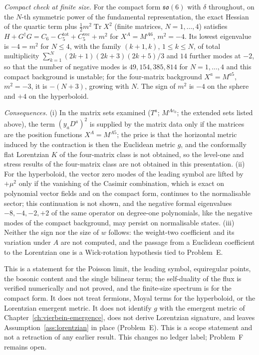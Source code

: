 \emph{Compact check at finite size.} For the compact form \(\mathfrak{so}(6)\) with \(\delta\) throughout, on the \(N\)-th symmetric power of the fundamental representation, the exact Hessian of the quartic term plus \(\tfrac12m^2\operatorname{Tr}X^2\) (finite matrices, \(N=1,\dots,4\)) satisfies \(H+G^\dagger G=C_6-C_5^{\mathrm{tot}}+C_5^{\mathrm{vec}}+m^2\) for \(X^A=M^{A6}\), \(m^2=-4\). Its lowest eigenvalue is \(-4=m^2\) for \(N\le4\), with the family \((k+1,k)\), \(1\le k\le N\), of total multiplicity \(\sum_{k=1}^{N}(2k+1)(2k+3)(2k+5)/3\) and \(14\) further modes at \(-2\), so that the number of negative modes is \(49,154,385,814\) for \(N=1,\dots,4\) and this compact background is unstable; for the four-matrix background \(X^a=M^{a5}\), \(m^2=-3\), it is \(-(N+3)\), growing with \(N\). The sign of \(m^2\) is \(-4\) on the sphere and \(+4\) on the hyperboloid.

\emph{Consequences.} (i) In the matrix sets examined (\(T^a\); \(M^{Ac_0}\); the extended sets listed above), the term \((y_aD^a)^2\) is supplied by the matrix data only if the matrices are the position functions \(X^A=M^{A5}\); the price is that the horizontal metric induced by the contraction is then the Euclidean metric \(g\), and the conformally flat Lorentzian \(K\) of the four-matrix class is not obtained, so the level-one and stress results of the four-matrix class are not obtained in this presentation. (ii) For the hyperboloid, the vector zero modes of the leading symbol are lifted by \(+\mu^2\) only if the vanishing of the Casimir combination, which is exact on polynomial vector fields and on the compact form, continues to the normalisable sector; this continuation is not shown, and the negative formal eigenvalues \(-8,-4,-2,+2\) of the same operator on degree-one polynomials, like the negative modes of the compact background, may persist on normalisable states. (iii) Neither the sign nor the size of \(w\) follows: the weight-two coefficient and its variation under \(A\) are not computed, and the passage from a Euclidean coefficient to the Lorentzian one is a Wick-rotation hypothesis tied to Problem~E.

This is a statement for the Poisson limit, the leading symbol, equiregular points, the bosonic content and the single bilinear term; the self-duality of the flux is verified numerically and not proved, and the finite-size spectrum is for the compact form. It does not treat fermions, Moyal terms for the hyperboloid, or the Lorentzian emergent metric. It does not identify \(g\) with the emergent metric of Chapter~\ref{ch:vierbein-emergence}, does not derive Lorentzian signature, and leaves Assumption~\ref{ass:lorentzian} in place (Problem~E). This is a scope statement and not a retraction of any earlier result. This changes no ledger label; Problem~F remains open.

